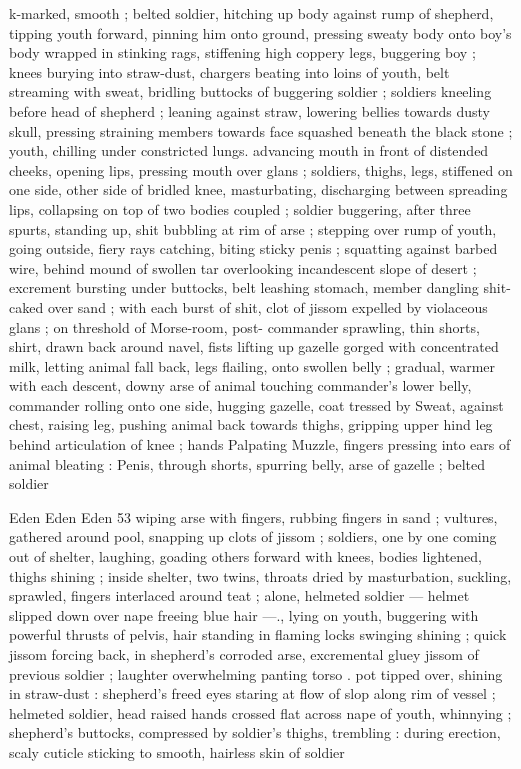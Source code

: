 k-marked, smooth ; belted soldier, hitching up body against rump
of shepherd, tipping youth forward, pinning him onto ground,
pressing sweaty body onto boy’s body wrapped in stinking rags,
stiffening high coppery legs, buggering boy ; knees burying into
straw-dust, chargers beating into loins of youth, belt streaming with
sweat, bridling buttocks of buggering soldier ; soldiers kneeling
before head of shepherd ; leaning against straw, lowering bellies
towards dusty skull, pressing straining members towards face
squashed beneath the black stone ; youth, chilling under constricted
lungs. advancing mouth in front of distended cheeks, opening lips,
pressing mouth over glans ; soldiers, thighs, legs, stiffened on one
side, other side of bridled knee, masturbating, discharging between
spreading lips, collapsing on top of two bodies coupled ; soldier
buggering, after three spurts, standing up, shit bubbling at rim of
arse ; stepping over rump of youth, going outside, fiery rays
catching, biting sticky penis ; squatting against barbed wire, behind
mound of swollen tar overlooking incandescent slope of desert ;
excrement bursting under buttocks, belt leashing stomach, member
dangling shit-caked over sand ; with each burst of shit, clot of jissom
expelled by violaceous glans ; on threshold of Morse-room, post-
commander sprawling, thin shorts, shirt, drawn back around navel,
fists lifting up gazelle gorged with concentrated milk, letting animal
fall back, legs flailing, onto swollen belly ; gradual, warmer with each
descent, downy arse of animal touching commander's lower belly,
commander rolling onto one side, hugging gazelle, coat tressed by
Sweat, against chest, raising leg, pushing animal back towards
thighs, gripping upper hind leg behind articulation of knee ; hands
Palpating Muzzle, fingers pressing into ears of animal bleating :
Penis, through shorts, spurring belly, arse of gazelle ; belted soldier

Eden Eden Eden 53
wiping arse with fingers, rubbing fingers in sand ; vultures, gathered
around pool, snapping up clots of jissom ; soldiers, one by one
coming out of shelter, laughing, goading others forward with knees,
bodies lightened, thighs shining ; inside shelter, two twins, throats
dried by masturbation, suckling, sprawled, fingers interlaced around
teat ; alone, helmeted soldier — helmet slipped down over nape
freeing blue hair —., lying on youth, buggering with powerful thrusts
of pelvis, hair standing in flaming locks swinging shining ; quick
jissom forcing back, in shepherd's corroded arse, excremental gluey
jissom of previous soldier ; laughter overwhelming panting torso .
pot tipped over, shining in straw-dust : shepherd's freed eyes staring
at flow of slop along rim of vessel ; helmeted soldier, head raised
hands crossed flat across nape of youth, whinnying ; shepherd's
buttocks, compressed by soldier's thighs, trembling : during
erection, scaly cuticle sticking to smooth, hairless skin of soldier

